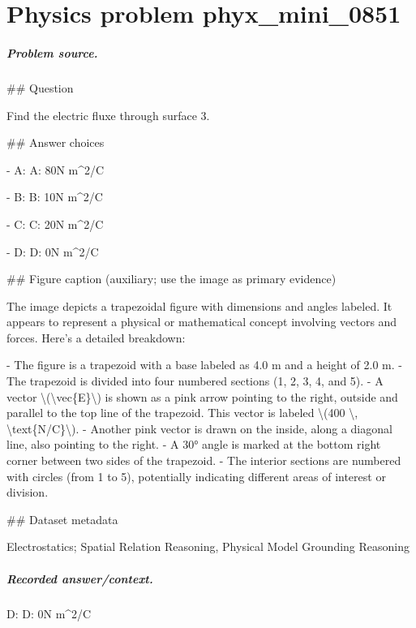 
\chapter{Physics problem phyx\_mini\_0851}
\label{ch:PhyXMiniProblems_problem_phyx_mini_0851}

\paragraph{Problem source.}
\#\# Question

Find the electric fluxe through surface 3.

\#\# Answer choices

- A: A: 80N m\textasciicircum{}2/C

- B: B: 10N m\textasciicircum{}2/C

- C: C: 20N m\textasciicircum{}2/C

- D: D: 0N m\textasciicircum{}2/C

\#\# Figure caption (auxiliary; use the image as primary evidence)

The image depicts a trapezoidal figure with dimensions and angles labeled. It appears to represent a physical or mathematical concept involving vectors and forces. Here's a detailed breakdown:

- The figure is a trapezoid with a base labeled as 4.0 m and a height of 2.0 m.
- The trapezoid is divided into four numbered sections (1, 2, 3, 4, and 5).
- A vector \textbackslash{}(\textbackslash{}vec\{E\}\textbackslash{}) is shown as a pink arrow pointing to the right, outside and parallel to the top line of the trapezoid. This vector is labeled \textbackslash{}(400 \textbackslash{}, \textbackslash{}text\{N/C\}\textbackslash{}).
- Another pink vector is drawn on the inside, along a diagonal line, also pointing to the right.
- A 30° angle is marked at the bottom right corner between two sides of the trapezoid.
- The interior sections are numbered with circles (from 1 to 5), potentially indicating different areas of interest or division.

\#\# Dataset metadata

Electrostatics; Spatial Relation Reasoning, Physical Model Grounding Reasoning

\paragraph{Recorded answer/context.}
D: D: 0N m\textasciicircum{}2/C

